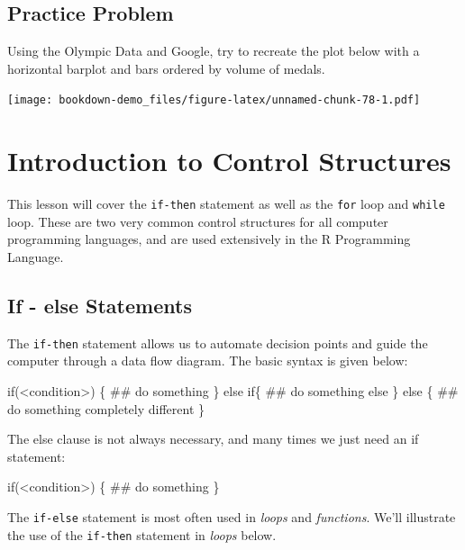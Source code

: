 \documentclass[]{book}
\newenvironment{Shaded}{\begin{snugshade}}{\end{snugshade}}
\newcommand{\NormalTok}[1]{{#1}}
\begin{document}
\section{Practice Problem}\label{practice-problem-2}

Using the Olympic Data and Google, try to recreate the plot below with a
horizontal barplot and bars ordered by volume of medals.

\texttt{[image: bookdown-demo\_files/figure-latex/unnamed-chunk-78-1.pdf]}

\chapter{Introduction to Control
Structures}\label{introduction-to-control-structures}

This lesson will cover the \texttt{if-then} statement as well as the
\texttt{for} loop and \texttt{while} loop. These are two very common
control structures for all computer programming languages, and are used
extensively in the R Programming Language.

\section{If - else Statements}\label{if---else-statements}

The \texttt{if-then} statement allows us to automate decision points and
guide the computer through a data flow diagram. The basic syntax is
given below:

\begin{Shaded}
\begin{Highlighting}[]
\NormalTok{if(<condition>) \{}
  \NormalTok{## do something}
\NormalTok{\} else if\{}
  \NormalTok{## do something else}
\NormalTok{\} else \{}
  \NormalTok{## do something completely different}
\NormalTok{\}}
\end{Highlighting}
\end{Shaded}

The else clause is not always necessary, and many times we just need an
if statement:

\begin{Shaded}
\begin{Highlighting}[]
\NormalTok{if(<condition>) \{}
  \NormalTok{## do something}
\NormalTok{\}}
\end{Highlighting}
\end{Shaded}

The \texttt{if-else} statement is most often used in \emph{loops} and
\emph{functions}. We'll illustrate the use of the \texttt{if-then}
statement in \emph{loops} below.
\end{document}
